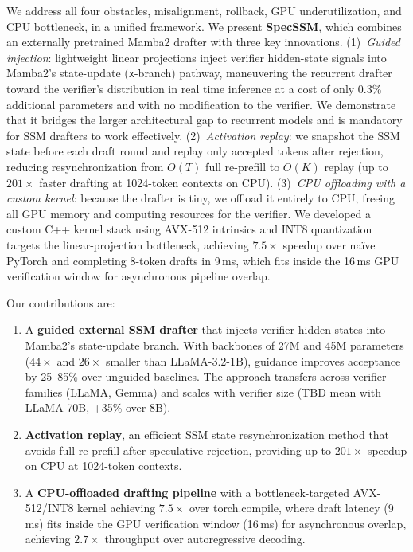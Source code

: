 We address all four obstacles, misalignment, rollback, GPU underutilization, and CPU bottleneck, in a unified framework.
We present \textbf{SpecSSM}, which combines an externally pretrained Mamba2 drafter with three key innovations.
(1)~\emph{Guided injection}: lightweight linear projections inject verifier hidden-state signals into Mamba2's state-update (\texttt{x}-branch) pathway, maneuvering the recurrent drafter toward the verifier's distribution in real time inference at a cost of only 0.3\% additional parameters and with no modification to the verifier. We demonstrate that it bridges the larger architectural gap to recurrent models and is mandatory for SSM drafters to work effectively.
(2)~\emph{Activation replay}: we snapshot the SSM state before each draft round and replay only accepted tokens after rejection, reducing resynchronization from $O(T)$ full re-prefill to $O(K)$ replay (up to $201\times$ faster drafting at 1024-token contexts on CPU).
(3)~\emph{CPU offloading with a custom kernel}: because the drafter is tiny, we offload it entirely to CPU, freeing all GPU memory and computing resources for the verifier.
We developed a custom C++ kernel stack using AVX-512 intrinsics and INT8 quantization targets the linear-projection bottleneck, achieving $7.5\times$ speedup over na\"ive PyTorch and completing 8-token drafts in 9\,ms, which fits inside the 16\,ms GPU verification window for asynchronous pipeline overlap.

Our contributions are:
\begin{enumerate}
    \item A \textbf{guided external SSM drafter} that injects verifier hidden states into Mamba2's state-update branch. With backbones of 27M and 45M parameters ($44\times$ and $26\times$ smaller than LLaMA-3.2-1B), guidance improves acceptance by 25--85\% over unguided baselines. The approach transfers across verifier families (LLaMA, Gemma) and scales with verifier size (TBD mean with LLaMA-70B, +35\% over 8B).
    \item \textbf{Activation replay}, an efficient SSM state resynchronization method that avoids full re-prefill after speculative rejection, providing up to $201\times$ speedup on CPU at 1024-token contexts.
    \item A \textbf{CPU-offloaded drafting pipeline} with a bottleneck-targeted AVX-512/INT8 kernel achieving $7.5\times$ over torch.compile, where draft latency (9\,ms) fits inside the GPU verification window (16\,ms) for asynchronous overlap, achieving $2.7\times$ throughput over autoregressive decoding.
\end{enumerate}
